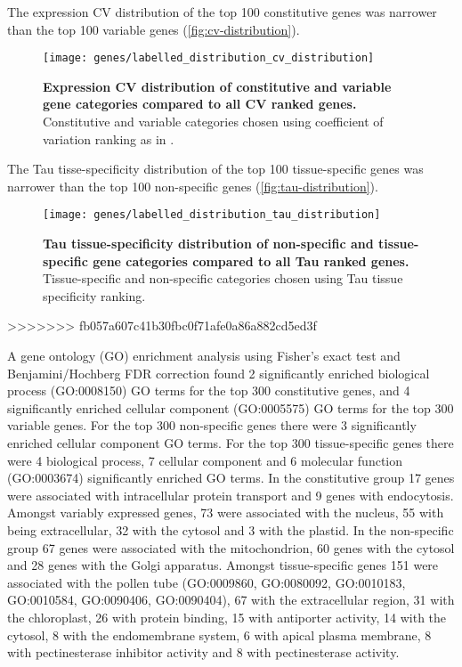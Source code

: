 \documentclass[../main.tex]{subfiles}
\begin{document}
The expression CV distribution of the top 100 constitutive genes was narrower than the top 100 variable genes (\autoref{fig:cv-distribution}).

\begin{figure}[hbt!]
	\begin{center}
		\capstart
		\texttt{[image: genes/labelled\_distribution\_cv\_distribution]}
		\caption{
			\textbf{Expression CV distribution of constitutive and variable gene categories compared to all CV ranked genes.}			
			Constitutive and variable categories chosen using coefficient of variation ranking as in \textcite{czechowskiGenomeWideIdentificationTesting2005}.			
			\label{fig:cv-distribution}
		}
	\end{center}
\end{figure}

The Tau tisse\hyp{}specificity distribution of the top 100 tissue\hyp{}specific genes was narrower than the top 100 non\hyp{}specific genes (\autoref{fig:tau-distribution}).


\begin{figure}[hbt!]
	\begin{center}
		\capstart
		\texttt{[image: genes/labelled\_distribution\_tau\_distribution]}
		\caption{
			\textbf{Tau tissue\hyp{}specificity distribution of non\hyp{}specific and tissue\hyp{}specific gene categories compared to all Tau ranked genes.}			
			Tissue\hyp{}specific and non\hyp{}specific categories chosen using Tau tissue specificity ranking.				
			\label{fig:tau-distribution}
		}
	\end{center}
\end{figure}
>>>>>>> fb057a607c41b30fbc0f71afe0a86a882cd5ed3f

A gene ontology (GO) enrichment analysis using Fisher's exact test \autocite{fisherInterpretationContingencyTables1922} and Benjamini/Hochberg FDR correction \autocite{benjaminiControllingFalseDiscovery1995} found 2 significantly enriched biological process (GO:0008150) GO terms for the top 300 constitutive genes, and 4 significantly enriched cellular component (GO:0005575) GO terms for the top 300 variable genes. For the top 300 non\hyp{}specific genes there were 3 significantly enriched cellular component GO terms. For the top 300 tissue\hyp{}specific genes there were 4 biological process, 7 cellular component and 6 molecular function (GO:0003674) significantly enriched GO terms.
In the constitutive group 17 genes were associated with intracellular protein transport and 9 genes with endocytosis.
Amongst variably expressed genes, 73 were associated with the nucleus, 55 with being extracellular, 32 with the cytosol and 3 with the plastid.
In the non\hyp{}specific group 67 genes were associated with the mitochondrion, 60 genes with the cytosol and 28 genes with the Golgi apparatus.
Amongst tissue\hyp{}specific genes 151 were associated with the pollen tube (GO:0009860, GO:0080092, GO:0010183, GO:0010584, GO:0090406, GO:0090404), 67 with the extracellular region,  31 with the chloroplast, 26 with protein binding, 15 with antiporter activity, 14 with the cytosol, 8 with the endomembrane system, 6 with apical plasma membrane,  8 with pectinesterase inhibitor activity and 8 with pectinesterase activity.
\end{document}
